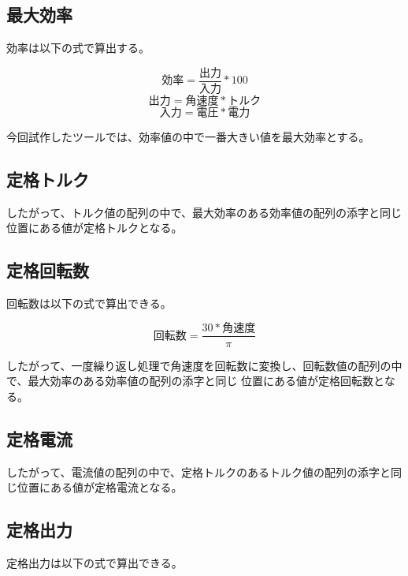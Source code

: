 \subsection{最大効率}\label{sub:keisan_saidaikouritu}
効率は以下の式で算出する。

\[
    \mbox{効率} = \frac{\mbox{出力}}{\mbox{入力}}  * 100 
\]
\[
    \mbox{出力} = \mbox{角速度} * \mbox{トルク} 
\]
\[  
    \mbox{入力} = \mbox{電圧} * \mbox{電力} 
\]

今回試作したツールでは、効率値の中で一番大きい値を最大効率とする。



\subsection{定格トルク}\label{sub:keisan_teikakutoruku}
したがって、トルク値の配列の中で、最大効率のある効率値の配列の添字と同じ位置にある値が定格トルクとなる。



\subsection{定格回転数}\label{sub:keisan_teikakukaiten}
回転数は以下の式で算出できる。

\[
    \mbox{回転数} = \frac{30 * \mbox{角速度}}{\pi}   
\]

したがって、一度繰り返し処理で角速度を回転数に変換し、回転数値の配列の中で、最大効率のある効率値の配列の添字と同じ
位置にある値が定格回転数となる。


\subsection{定格電流}\label{sub:keisan_teikakuden}
したがって、電流値の配列の中で、定格トルクのあるトルク値の配列の添字と同じ位置にある値が定格電流となる。


\subsection{定格出力}\label{sub:keisan_teikakusyutu}
定格出力は以下の式で算出できる。

